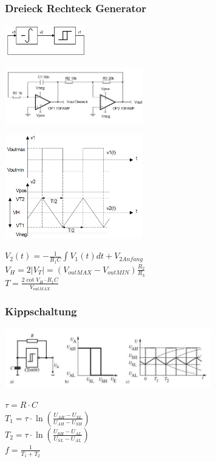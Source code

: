 \subsubsection{Dreieck Rechteck Generator}
	\begin{multicols}{3}
		\begin{center}
			\includegraphics[width=3.5cm]{images/osziDreieckRechteckBlock.png}\\
		\end{center}
		\includegraphics[width=6cm]{images/osziDreieckRechteck.png}
		\columnbreak
		
		\includegraphics[width=6cm]{images/osziDreieckRechteckSignal.png}
		\columnbreak
			
		$V_2\left(t\right)=-\frac{1}{R_1C}\int V_1\left(t\right)dt+V_{2 Anfang}$\\
		$V_H=2\left|V_T\right|=\left(V_{outMAX}-V_{outMIN}\right)\frac{R_2}{R_3}$\\
		$T=\frac{2\cot V_H \cdot R_1C}{V_{outMAX}}$\\
	\end{multicols}
\subsubsection{Kippschaltung}
	\begin{minipage}{9cm}
		\includegraphics[width=9cm]{images/kippschaltung}
	\end{minipage}
	\begin{minipage}{6cm}
		$\tau = R \cdot C $\\
		$T_1 = \tau \cdot \ln \left(\frac{U_{AH}-U_{SL}}{U_{AH}-U_{SH}} \right)$ \\
		$T_2 = \tau \cdot \ln \left(\frac{U_{SH}-U_{AL}}{U_{SL}-U_{AL}} \right)$ \\
		$f = \frac{1}{T_1 + T_2}$
	\end{minipage}
